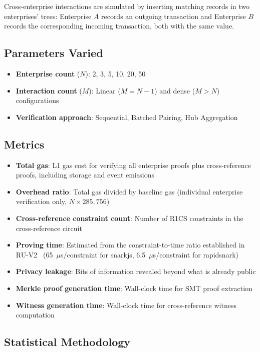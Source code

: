 Cross-enterprise interactions are simulated by inserting matching records in
two enterprises' trees: Enterprise $A$ records an outgoing transaction and
Enterprise $B$ records the corresponding incoming transaction, both with the
same value.

\subsection{Parameters Varied}

\begin{itemize}
\item \textbf{Enterprise count} ($N$): 2, 3, 5, 10, 20, 50
\item \textbf{Interaction count} ($M$): Linear ($M = N-1$) and dense
  ($M > N$) configurations
\item \textbf{Verification approach}: Sequential, Batched Pairing, Hub
  Aggregation
\end{itemize}

\subsection{Metrics}

\begin{itemize}
\item \textbf{Total gas}: L1 gas cost for verifying all enterprise proofs
  plus cross-reference proofs, including storage and event emissions
\item \textbf{Overhead ratio}: Total gas divided by baseline gas (individual
  enterprise verification only, $N \times 285{,}756$)
\item \textbf{Cross-reference constraint count}: Number of R1CS constraints
  in the cross-reference circuit
\item \textbf{Proving time}: Estimated from the constraint-to-time ratio
  established in RU-V2~\cite{ruv2circuit} (65~$\mu$s/constraint for snarkjs,
  6.5~$\mu$s/constraint for rapidsnark)
\item \textbf{Privacy leakage}: Bits of information revealed beyond what is
  already public
\item \textbf{Merkle proof generation time}: Wall-clock time for SMT proof
  extraction
\item \textbf{Witness generation time}: Wall-clock time for cross-reference
  witness computation
\end{itemize}

\subsection{Statistical Methodology}

